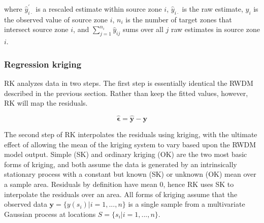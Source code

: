 where $\hat{y}^{'}_{i\cdot}$ is a rescaled estimate within source zone $i$, $\hat{y}_{i\cdot}$ is the raw estimate, $y_i$ is the observed value of source zone $i$, $n_i$ is the number of target zones that intersect source zone $i$, and $\sum_{j=1}^{n_i} \hat{y}_{ij}$ sums over all $j$ raw estimates in source zone $i$.


\subsubsection{Regression kriging} \label{sec:rk}

RK analyzes data in two steps.  The first step is essentially identical the RWDM described in the previous section.  Rather than keep the fitted values, however, RK will map the residuals.

\[\hat{\bm{\epsilon}} = \hat{\bm{y}} - \bm{y}\]

The second step of RK interpolates the residuals using kriging, with the ultimate effect of allowing the mean of the kriging system to vary based upon the RWDM model output.  Simple (SK) and ordinary kriging (OK) are the two most basic forms of kriging, and both assume the data is generated by an intrinsically stationary process with a constant but known (SK) or unknown (OK) mean over a sample area.  Residuals by definition have mean $0$, hence RK uses SK to interpolate the residuals over an area.  All forms of kriging assume that the observed data $\bm{y}=\{y(s_i) | i=1, ..., n\}$ is a single sample from a multivariate Gaussian process at locations $S=\{s_i | i=1, ..., n\}$.


